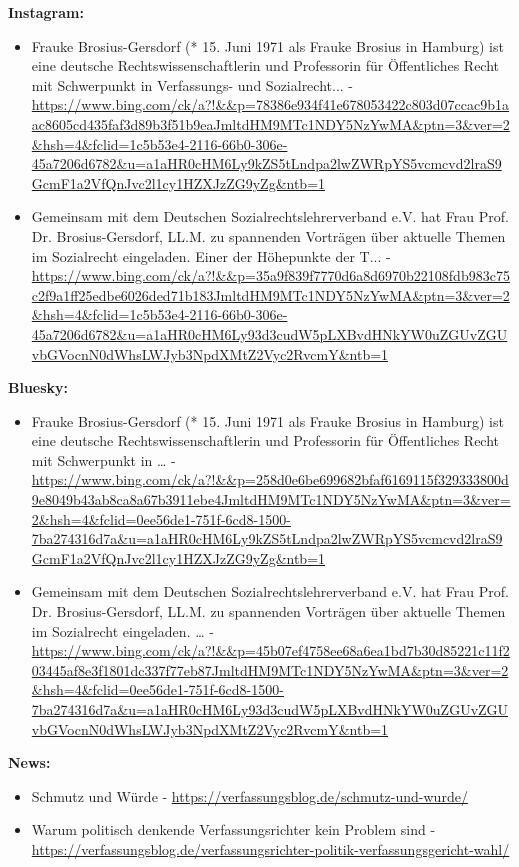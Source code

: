 \documentclass[12pt,a4paper]{article}
\begin{document}
\textbf{Instagram:}
\begin{itemize}
\item Frauke Brosius-Gersdorf (* 15. Juni 1971 als Frauke Brosius in Hamburg) ist eine deutsche Rechtswissenschaftlerin und Professorin für Öffentliches Recht mit Schwerpunkt in Verfassungs- und Sozialrecht... - \url{https://www.bing.com/ck/a?!&&p=78386e934f41e678053422c803d07ccac9b1aac8605cd435faf3d89b3f51b9eaJmltdHM9MTc1NDY5NzYwMA&ptn=3&ver=2&hsh=4&fclid=1c5b53e4-2116-66b0-306e-45a7206d6782&u=a1aHR0cHM6Ly9kZS5tLndpa2lwZWRpYS5vcmcvd2lraS9GcmF1a2VfQnJvc2l1cy1HZXJzZG9yZg&ntb=1}
\item Gemeinsam mit dem Deutschen Sozialrechtslehrerverband e.V. hat Frau Prof. Dr. Brosius-Gersdorf, LL.M. zu spannenden Vorträgen über aktuelle Themen im Sozialrecht eingeladen. Einer der Höhepunkte der T... - \url{https://www.bing.com/ck/a?!&&p=35a9f839f7770d6a8d6970b22108fdb983c75c2f9a1ff25edbe6026ded71b183JmltdHM9MTc1NDY5NzYwMA&ptn=3&ver=2&hsh=4&fclid=1c5b53e4-2116-66b0-306e-45a7206d6782&u=a1aHR0cHM6Ly93d3cudW5pLXBvdHNkYW0uZGUvZGUvbGVocnN0dWhsLWJyb3NpdXMtZ2Vyc2RvcmY&ntb=1}
\end{itemize}

\textbf{Bluesky:}
\begin{itemize}
\item Frauke Brosius-Gersdorf (* 15. Juni 1971 als Frauke Brosius in Hamburg) ist eine deutsche Rechtswissenschaftlerin und Professorin für Öffentliches Recht mit Schwerpunkt in … - \url{https://www.bing.com/ck/a?!&&p=258d0e6be699682bfaf6169115f329333800d9e8049b43ab8ca8a67b3911ebe4JmltdHM9MTc1NDY5NzYwMA&ptn=3&ver=2&hsh=4&fclid=0ee56de1-751f-6cd8-1500-7ba274316d7a&u=a1aHR0cHM6Ly9kZS5tLndpa2lwZWRpYS5vcmcvd2lraS9GcmF1a2VfQnJvc2l1cy1HZXJzZG9yZg&ntb=1}
\item Gemeinsam mit dem Deutschen Sozialrechtslehrerverband e.V. hat Frau Prof. Dr. Brosius-Gersdorf, LL.M. zu spannenden Vorträgen über aktuelle Themen im Sozialrecht eingeladen. … - \url{https://www.bing.com/ck/a?!&&p=45b07ef4758ee68a6ea1bd7b30d85221c11f203445af8e3f1801dc337f77eb87JmltdHM9MTc1NDY5NzYwMA&ptn=3&ver=2&hsh=4&fclid=0ee56de1-751f-6cd8-1500-7ba274316d7a&u=a1aHR0cHM6Ly93d3cudW5pLXBvdHNkYW0uZGUvZGUvbGVocnN0dWhsLWJyb3NpdXMtZ2Vyc2RvcmY&ntb=1}
\end{itemize}

\textbf{News:}
\begin{itemize}
\item Schmutz und Würde - \url{https://verfassungsblog.de/schmutz-und-wurde/}
\item Warum politisch denkende Verfassungsrichter kein Problem sind - \url{https://verfassungsblog.de/verfassungsrichter-politik-verfassungsgericht-wahl/}
\end{itemize}
\end{document}
